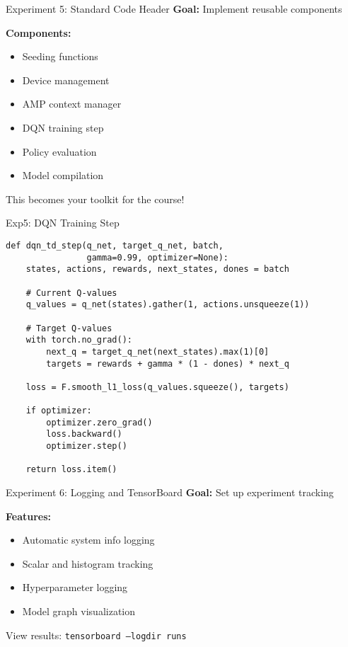 \documentclass[aspectratio=169,10pt]{beamer}
\begin{document}
\begin{frame}{Experiment 5: Standard Code Header}
\textbf{Goal:} Implement reusable components

\textbf{Components:}
\begin{itemize}
    \item Seeding functions
    \item Device management
    \item AMP context manager
    \item DQN training step
    \item Policy evaluation
    \item Model compilation
\end{itemize}

This becomes your toolkit for the course!
\end{frame}

\begin{frame}[fragile]{Exp5: DQN Training Step}
\begin{lstlisting}
def dqn_td_step(q_net, target_q_net, batch, 
                gamma=0.99, optimizer=None):
    states, actions, rewards, next_states, dones = batch
    
    # Current Q-values
    q_values = q_net(states).gather(1, actions.unsqueeze(1))
    
    # Target Q-values
    with torch.no_grad():
        next_q = target_q_net(next_states).max(1)[0]
        targets = rewards + gamma * (1 - dones) * next_q
    
    loss = F.smooth_l1_loss(q_values.squeeze(), targets)
    
    if optimizer:
        optimizer.zero_grad()
        loss.backward()
        optimizer.step()
    
    return loss.item()
\end{lstlisting}
\end{frame}

\begin{frame}{Experiment 6: Logging and TensorBoard}
\textbf{Goal:} Set up experiment tracking

\textbf{Features:}
\begin{itemize}
    \item Automatic system info logging
    \item Scalar and histogram tracking
    \item Hyperparameter logging
    \item Model graph visualization
\end{itemize}

View results: \texttt{tensorboard --logdir runs}
\end{frame}
\end{document}
